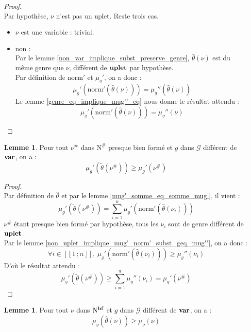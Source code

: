 \documentclass[a4paper]{report}
\newenvironment{preuve} 
  {\begin{proof}~\\} 
  {\end{proof}}
\theoremstyle{definition}
\newtheorem{lemme}[theoreme]{Lemme}
\newcommand{\interval}[2]{[\![#1\,;#2]\!]}
\newcommand{\norm}{\mathrm{norm}}
\newcommand{\G}{\mathscr{G}}
\newcommand{\N}{\mathrm{N}}
\begin{document}
\begin{preuve}
  Par hypothèse, $\nu$ n'est pas un uplet. Reste trois cas.
  \begin{itemize}[label={\textbf{Si}}]
    \item
      $\nu$ est une variable : trivial.
    \item
      non : \\
      Par le lemme \ref{non_var_implique_subst_preserve_genre}, $\hat\theta (\nu)$ est du même genre que $\nu$, différent de $\bold{uplet}$ par hypothèse. \\
      Par définition de $\norm'$ et $\mu_g'$, on a donc :
      \[ \mu_g' (\norm' (\hat\theta (\nu))) = \mu_g'' (\hat\theta (\nu)) \]
      Le lemme \ref{genre_eq_implique_mug''_eq} nous donne le résultat attendu :
      \[ \mu_g' (\norm' (\hat\theta (\nu))) = \mu_g'' (\nu) \]
  \end{itemize}
\end{preuve}

\begin{lemme} \label{pbf_implique_mug'_subst_geq_mug'}
  Pour tout $\nu^\#$ dans $\N^\#$ presque bien formé et $g$ dans $\G$ différent de $\bold{var}$, on a :
  \[ \mu_g' (\tilde\theta (\nu^\#)) \geqslant \mu_g' (\nu^\#) \]
\end{lemme}

\begin{preuve}
  Par définition de $\hat\theta$ et par le lemme \ref{mug'_somme_eq_somme_mug'}, il vient :
  \[ \mu_g' (\tilde\theta (\nu^\#)) = \sum_{i=1}^n \mu_g' (\norm' (\hat\theta (\nu_i))) \]
  $\nu^\#$ étant presque bien formé par hypothèse, tous les $\nu_i$ sont de genre différent de $\bold{uplet}$. \\
  Par le lemme \ref{non_uplet_implique_mug'_norm'_subst_geq_mug''}, on a donc :
  \[ \forall i \in \interval 1 n,\ \mu_g' (\norm' (\hat\theta (\nu_i))) \geqslant \mu_g'' (\nu_i) \]
  D'où le résultat attendu :
  \[ \mu_g' (\tilde\theta (\nu^\#)) \geqslant \sum_{i=1}^n \mu_g'' (\nu_i) = \mu_g' (\nu^\#) \]
\end{preuve}

\begin{lemme} \label{bf_implique_mug_subst_geq_mug}
  Pour tout $\nu$ dans $\N^{\bold{bf}}$ et $g$ dans $\G$ différent de $\bold{var}$, on a :
  \[ \mu_g (\hat\theta (\nu)) \geqslant \mu_g (\nu) \]
\end{lemme}
\end{document}
